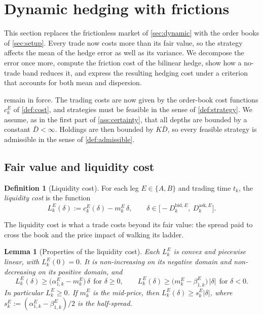 \documentclass[11pt,a4paper]{article}
\theoremstyle{plain}
\newtheorem{lemma}[theorem]{Lemma}
\theoremstyle{definition}
\newtheorem{definition}[theorem]{Definition}
\theoremstyle{remark}
\newcommand{\1}{\mathbf{1}}
\begin{document}
\section{Dynamic hedging with frictions}
\label{sec:frictions}
This section replaces the frictionless market of \cref{sec:dynamic} with the order books of \cref{sec:setup}. Every trade now costs more than its fair value, so the strategy affects the mean of the hedge error as well as its variance. We decompose the error once more, compute the friction cost of the bilinear hedge, show how a no-trade band reduces it, and express the resulting hedging cost under a criterion that accounts for both mean and dispersion.

 remain in force. The trading costs are now given by the order-book cost functions $c^E_k$ of \cref{def:cost}, and strategies must be feasible in the sense of \cref{def:strategy}. We assume, as in the first part of \cref{ass:certainty}, that all depths are bounded by a constant $\bar D<\infty$. Holdings are then bounded by $K\bar D$, so every feasible strategy is admissible in the sense of \cref{def:admissible}.

\subsection{Fair value and liquidity cost}

\begin{definition}[Liquidity cost]
\label{def:liquidity}
For each leg $E\in\{A,B\}$ and trading time $t_k$, the \emph{liquidity cost} is the function
\[
L^E_k(\delta) := c^E_k(\delta) - m^E_k\,\delta,\qquad \delta\in\bigl[-D^{\mathrm{bid},E}_k,\ D^{\mathrm{ask},E}_k\bigr].
\]
\end{definition}

The liquidity cost is what a trade costs beyond its fair value: the spread paid to cross the book and the price impact of walking its ladder.

\begin{lemma}[Properties of the liquidity cost]
\label{lem:liquidity}
Each $L^E_k$ is convex and piecewise linear, with $L^E_k(0)=0$. It is non-increasing on its negative domain and non-decreasing on its positive domain, and
\[
L^E_k(\delta)\geq \bigl(\alpha^E_{1,k}-m^E_k\bigr)\,\delta\ \ \text{for }\delta\geq 0,\qquad L^E_k(\delta)\geq \bigl(m^E_k-\beta^E_{1,k}\bigr)\,|\delta|\ \ \text{for }\delta<0.
\]
In particular $L^E_k\geq 0$. If $m^E_k$ is the mid-price, then $L^E_k(\delta)\geq s^E_k|\delta|$, where $s^E_k := (\alpha^E_{1,k}-\beta^E_{1,k})/2$ is the half-spread.
\end{lemma}
\end{document}
